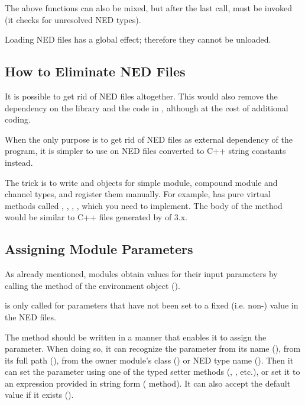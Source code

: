 The above functions can also be mixed, but after the last call,
 must be invoked (it checks for unresolved
NED types).

Loading NED files has a global effect; therefore they cannot be unloaded.


\subsection{How to Eliminate NED Files}
\label{sec:embedding:eliminating-ned-files}

It is possible to get rid of NED files altogether. This would also
remove the dependency on the  library and the code in
, although at the cost of additional coding.

\begin{note}
When the only purpose is to get rid of NED files as external dependency
of the program, it is simpler to use  on NED files
converted to C++ string constants instead.
\end{note}

The trick is to write  and  objects
for simple module, compound module and channel types, and register them
manually. For example,  has pure virtual methods called
, ,
, , which you
need to implement. The body of the  method would
be similar to C++ files generated by  of {\opp} 3.x.


\subsection{Assigning Module Parameters}
\label{sec:embedding:assigning-module-parameters}

As already mentioned, modules obtain values for their input parameters
by calling the  method of the environment object
().

\begin{note}
 is only called for parameters that have not
been set to a fixed (i.e. non-) value in the NED files.
\end{note}

The  method should be written in a manner that enables it to assign
the parameter. When doing so, it can recognize the parameter from its name
(), from its full path (),
from the owner module's class ()
or NED type name ().
Then it can set the parameter using one of the typed setter methods
(, , etc.), or set it
to an expression provided in string form ( method).
It can also accept the default value if it exists ().

